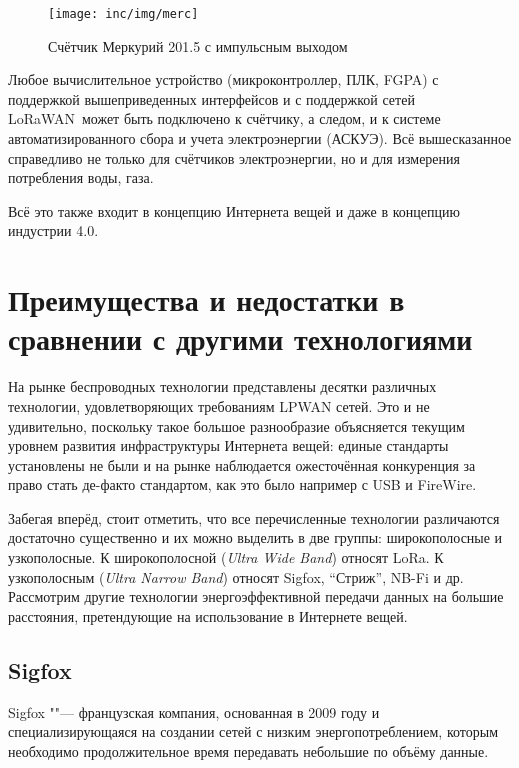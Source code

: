 \begin{figure}[!h]
  \centering
  \texttt{[image: inc/img/merc]}
  \caption{Счётчик Меркурий 201.5 с импульсным выходом}
  \label{fig:mercury}
\end{figure}

Любое вычислительное устройство (микроконтроллер, ПЛК, FGPA) с поддержкой 
вышеприведенных интерфейсов и с поддержкой сетей LoRaWAN\texttrademark~может 
быть подключено к 
счётчику, а следом, и к системе автоматизированного сбора и учета 
электроэнергии (АСКУЭ).
Всё вышесказанное справедливо не только для счётчиков электроэнергии, но и для 
измерения потребления воды, газа.

Всё это также входит в концепцию Интернета вещей и даже в концепцию 
индустрии 4.0.



\section{Преимущества и недостатки в сравнении с другими технологиями}

На рынке беспроводных технологии представлены десятки различных технологии, 
удовлетворяющих требованиям LPWAN сетей.
Это и не удивительно, поскольку такое большое разнообразие объясняется текущим 
уровнем развития инфраструктуры Интернета вещей: единые стандарты установлены 
не 
были и на рынке наблюдается ожесточённая конкуренция за право стать де-факто 
стандартом, как это было например с USB и FireWire.

Забегая вперёд, стоит отметить, что все перечисленные технологии различаются 
достаточно существенно и их можно выделить в две группы: широкополосные и 
узкополосные.
К широкополосной (\textit{Ultra Wide Band}) относят LoRa\texttrademark.
К узкополосным (\textit{Ultra Narrow Band}) относят Sigfox, ``Стриж'', NB-Fi и 
др.
Рассмотрим другие технологии энергоэффективной передачи данных на большие 
расстояния, претендующие на использование в Интернете вещей.

\subsection{Sigfox}

Sigfox ""--- французская компания, основанная в 2009 году и специализирующаяся 
на создании сетей с низким энергопотреблением, которым необходимо 
продолжительное время передавать небольшие по объёму данные.

